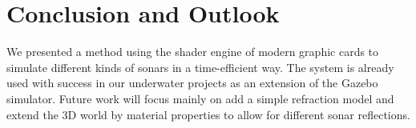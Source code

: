 \documentclass[final,5p,times]{elsarticle}
\begin{document}
%
%
%
%
%


\section{Conclusion and Outlook}
\label{}

We presented a method using the shader engine of modern graphic cards to simulate different kinds of sonars in a time-efficient way. The system is already used with success in our underwater projects as an extension of the Gazebo simulator. Future work will focus mainly on add a simple refraction model and extend the 3D world by material properties to allow for different sonar reflections.
\end{document}
